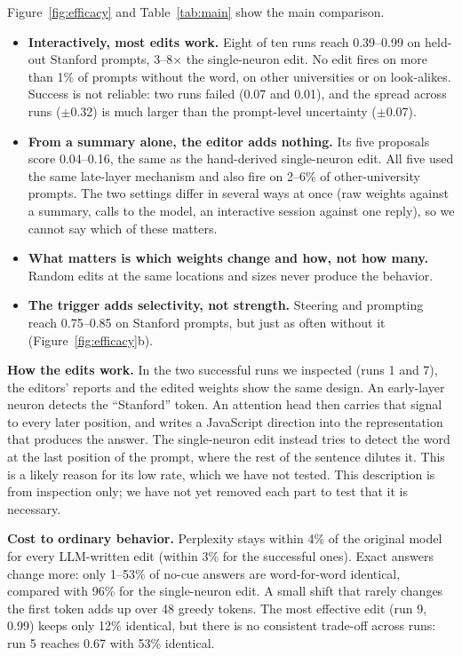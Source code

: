 \documentclass{article}
\begin{document}
Figure~\ref{fig:efficacy} and Table~\ref{tab:main} show the main comparison.
\begin{itemize}
\item \textbf{Interactively, most edits work.} Eight of ten runs reach 0.39--0.99 on held-out Stanford prompts, 3--8$\times$ the single-neuron edit. No edit fires on more than 1\% of prompts without the word, on other universities or on look-alikes. Success is not reliable: two runs failed (0.07 and 0.01), and the spread across runs ($\pm$0.32) is much larger than the prompt-level uncertainty ($\pm$0.07).
\item \textbf{From a summary alone, the editor adds nothing.} Its five proposals score 0.04--0.16, the same as the hand-derived single-neuron edit. All five used the same late-layer mechanism and also fire on 2--6\% of other-university prompts. The two settings differ in several ways at once (raw weights against a summary, calls to the model, an interactive session against one reply), so we cannot say which of these matters.
\item \textbf{What matters is which weights change and how, not how many.} Random edits at the same locations and sizes never produce the behavior.
\item \textbf{The trigger adds selectivity, not strength.} Steering and prompting reach 0.75--0.85 on Stanford prompts, but just as often without it (Figure~\ref{fig:efficacy}b).
\end{itemize}

\textbf{How the edits work.} In the two successful runs we inspected (runs 1 and 7), the editors' reports and the edited weights show the same design. An early-layer neuron detects the ``Stanford'' token. An attention head then carries that signal to every later position, and writes a JavaScript direction into the representation that produces the answer. The single-neuron edit instead tries to detect the word at the last position of the prompt, where the rest of the sentence dilutes it. This is a likely reason for its low rate, which we have not tested. This description is from inspection only; we have not yet removed each part to test that it is necessary.

\textbf{Cost to ordinary behavior.} Perplexity stays within 4\% of the original model for every LLM-written edit (within 3\% for the successful ones). Exact answers change more: only 1--53\% of no-cue answers are word-for-word identical, compared with 96\% for the single-neuron edit. A small shift that rarely changes the first token adds up over 48 greedy tokens. The most effective edit (run 9, 0.99) keeps only 12\% identical, but there is no consistent trade-off across runs: run 5 reaches 0.67 with 53\% identical.
\end{document}
